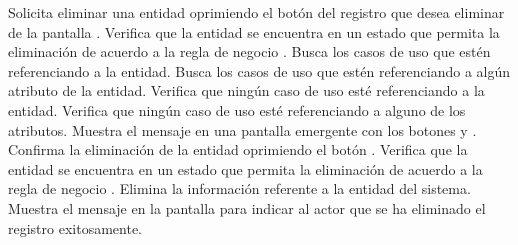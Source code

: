  \begin{UCtrayectoria}
    \UCpaso[\UCactor] Solicita eliminar una entidad oprimiendo el botón \btnEliminar del registro que desea eliminar de la pantalla .
    \UCpaso[\UCsist] Verifica que la entidad se encuentra en un estado que permita la eliminación de acuerdo a la regla de negocio . 
    \UCpaso[\UCsist] Busca los casos de uso que estén referenciando a la entidad.
    \UCpaso[\UCsist] Busca los casos de uso que estén referenciando a algún atributo de la entidad.
    \UCpaso[\UCsist] Verifica que ningún caso de uso esté referenciando a la entidad. 
    \UCpaso[\UCsist] Verifica que ningún caso de uso esté referenciando a alguno de los atributos. 
    \UCpaso[\UCsist] Muestra el mensaje  en una pantalla emergente con los botones  y .
    \UCpaso[\UCactor] Confirma la eliminación de la entidad oprimiendo el botón . 
    \UCpaso[\UCsist] Verifica que la entidad se encuentra en un estado que permita la eliminación de acuerdo a la regla de negocio . 
    \UCpaso[\UCsist] Elimina la información referente a la entidad del sistema.
    \UCpaso[\UCsist] Muestra el mensaje  en la pantalla 
    para indicar al actor que se ha eliminado el registro exitosamente.
 \end{UCtrayectoria}
 
